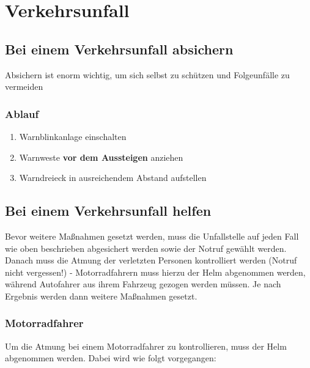 \part{Verkehrsunfall}
\chapter{Bei einem Verkehrsunfall absichern}
Absichern ist enorm wichtig, um sich selbst zu schützen und Folgeunfälle zu vermeiden
\section*{Ablauf}
\begin{enumerate}
    \item Warnblinkanlage einschalten
    \item Warnweste \textbf{vor dem Aussteigen} anziehen
    \item Warndreieck in ausreichendem Abstand aufstellen
\end{enumerate}

\chapter{Bei einem Verkehrsunfall helfen}
Bevor weitere Maßnahmen gesetzt werden, muss die Unfallstelle auf jeden Fall wie oben beschrieben abgesichert werden sowie der Notruf gewählt werden.
Danach muss die Atmung der verletzten Personen kontrolliert werden (Notruf nicht vergessen!) - Motorradfahrern muss hierzu der Helm abgenommen werden, während Autofahrer aus ihrem Fahrzeug gezogen werden müssen.
Je nach Ergebnis werden dann weitere Maßnahmen gesetzt.

\section{Motorradfahrer}
Um die Atmung bei einem Motorradfahrer zu kontrollieren, muss der Helm abgenommen werden. Dabei wird wie folgt vorgegangen:
